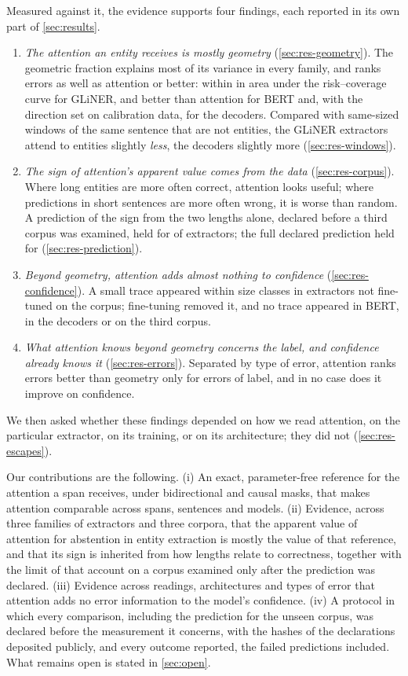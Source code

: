 \documentclass[11pt,a4paper]{article}
\newcommand{\gliner}{GLiNER}
\begin{document}
Measured against it, the evidence supports four findings, each reported in its own part of \cref{sec:results}.
\begin{enumerate}
  \item \emph{The attention an entity receives is mostly geometry} (\cref{sec:res-geometry}). The geometric fraction
  explains most of its variance in every family, and ranks errors as well as attention or better: within \encMassGeoMaxGap{} in
  area under the risk--coverage curve for \gliner{}, and better than attention for BERT and, with the direction set on
  calibration data, for the decoders. Compared with same-sized windows of the same sentence that are not entities, the
  \gliner{} extractors attend to entities slightly \emph{less}, the decoders slightly more (\cref{sec:res-windows}).
  \item \emph{The sign of attention's apparent value comes from the data} (\cref{sec:res-corpus}). Where long entities are
  more often correct, attention looks useful; where predictions in short sentences are more often wrong, it is worse than
  random. A prediction of the sign from the two lengths alone, declared before a third corpus was examined, held for
  \predPoneOk{} of \predN{} extractors; the full declared prediction held for \predConfirmed{} (\cref{sec:res-prediction}).
  \item \emph{Beyond geometry, attention adds almost nothing to confidence} (\cref{sec:res-confidence}). A small trace
  appeared within size classes in extractors not fine-tuned on the corpus; fine-tuning removed it, and no trace appeared in
  BERT, in the decoders or on the third corpus.
  \item \emph{What attention knows beyond geometry concerns the label, and confidence already knows it}
  (\cref{sec:res-errors}). Separated by type of error, attention ranks errors better than geometry only for errors of label,
  and in no case does it improve on confidence.
\end{enumerate}
We then asked whether these findings depended on how we read attention, on the particular extractor, on its training, or
on its architecture; they did not (\cref{sec:res-escapes}).

Our contributions are the following. (i) An exact, parameter-free reference for the attention a span receives, under
bidirectional and causal masks, that makes attention comparable across spans, sentences and models. (ii) Evidence, across
three families of extractors and three corpora, that the apparent value of attention for abstention in entity extraction
is mostly the value of that reference, and that its sign is inherited from how lengths relate to correctness, together with
the limit of that account on a corpus examined only after the prediction was declared. (iii) Evidence across readings,
architectures and types of error that attention adds no error information to the model's confidence. (iv) A protocol in
which every comparison, including the prediction for the unseen corpus, was declared before the measurement it concerns,
with the hashes of the declarations deposited publicly, and every outcome reported, the failed predictions included.
What remains open is stated in \cref{sec:open}.
\end{document}
